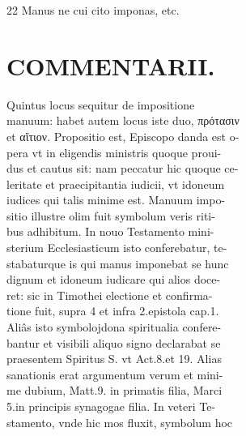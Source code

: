 \documentclass{article}
\begin{document}
\begin{pages}
22 Manus ne cui cito imponas, etc. \\
                
\section*{COMMENTARII. \\
                }Quintus locus sequitur de impositione \\
                manuum: habet autem locus iste duo, πρότασιν \\
                et αἴτιον. Propositio est, Episcopo danda est o- \\
                pera vt in eligendis ministris quoque proui- \\
                dus et cautus sit: nam peccatur hic quoque ce- \\
                leritate et praecipitantia iudicii, vt idoneum \\
                iudices qui talis minime est. Manuum impo- \\
                sitio illustre olim fuit symbolum veris riti- \\
                bus adhibitum. In nouo Testamento mini- \\
                sterium Ecclesiasticum isto conferebatur, te- \\
                stabaturque is qui manus imponebat se hunc \\
                dignum et idoneum iudicare qui alios doce- \\
                ret: sic in Timothei electione et confirma- \\
                tione fuit, supra 4 et infra 2.epistola cap.1. \\
                Aliâs isto symbolojdona spiritualia confere- \\
                bantur et visibili aliquo signo declarabat se \\
                praesentem Spiritus S. vt Act.8.et 19. Alias \\
                sanationis erat argumentum verum et mini- \\
                me dubium, Matt.9. in primatis filia, Marci \\
                5.in principis synagogae filia. In veteri Te- \\
                stamento, vnde hic mos fluxit, symbolum hoc \\

\end{pages}
\end{document}
